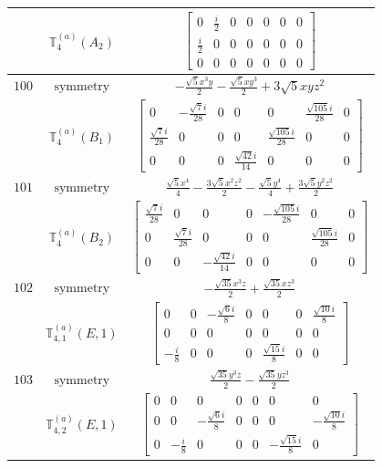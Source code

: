 \documentclass[fleqn,8pt,landscape]{jsarticle}
\begin{document}
\begin{longtable}{ccc}
$  $ & $ \mathbb{T}_{4}^{(a)}(A_{2}) $ & $ \begin{bmatrix} 0 & \frac{i}{2} & 0 & 0 & 0 & 0 & 0 \\ \frac{i}{2} & 0 & 0 & 0 & 0 & 0 & 0 \\ 0 & 0 & 0 & 0 & 0 & 0 & 0 \end{bmatrix} $ \\ \hline
$ 100 $ & $ \text{symmetry} $ & $ - \frac{\sqrt{5} x^{3} y}{2} - \frac{\sqrt{5} x y^{3}}{2} + 3 \sqrt{5} x y z^{2} $ \\
$  $ & $ \mathbb{T}_{4}^{(a)}(B_{1}) $ & $ \begin{bmatrix} 0 & - \frac{\sqrt{7} i}{28} & 0 & 0 & 0 & \frac{\sqrt{105} i}{28} & 0 \\ \frac{\sqrt{7} i}{28} & 0 & 0 & 0 & \frac{\sqrt{105} i}{28} & 0 & 0 \\ 0 & 0 & 0 & \frac{\sqrt{42} i}{14} & 0 & 0 & 0 \end{bmatrix} $ \\ \hline
$ 101 $ & $ \text{symmetry} $ & $ \frac{\sqrt{5} x^{4}}{4} - \frac{3 \sqrt{5} x^{2} z^{2}}{2} - \frac{\sqrt{5} y^{4}}{4} + \frac{3 \sqrt{5} y^{2} z^{2}}{2} $ \\
$  $ & $ \mathbb{T}_{4}^{(a)}(B_{2}) $ & $ \begin{bmatrix} \frac{\sqrt{7} i}{28} & 0 & 0 & 0 & - \frac{\sqrt{105} i}{28} & 0 & 0 \\ 0 & \frac{\sqrt{7} i}{28} & 0 & 0 & 0 & \frac{\sqrt{105} i}{28} & 0 \\ 0 & 0 & - \frac{\sqrt{42} i}{14} & 0 & 0 & 0 & 0 \end{bmatrix} $ \\ \hline
$ 102 $ & $ \text{symmetry} $ & $ - \frac{\sqrt{35} x^{3} z}{2} + \frac{\sqrt{35} x z^{3}}{2} $ \\
$  $ & $ \mathbb{T}_{4,1}^{(a)}(E,1) $ & $ \begin{bmatrix} 0 & 0 & - \frac{\sqrt{6} i}{8} & 0 & 0 & 0 & \frac{\sqrt{10} i}{8} \\ 0 & 0 & 0 & 0 & 0 & 0 & 0 \\ - \frac{i}{8} & 0 & 0 & 0 & \frac{\sqrt{15} i}{8} & 0 & 0 \end{bmatrix} $ \\ \hline
$ 103 $ & $ \text{symmetry} $ & $ \frac{\sqrt{35} y^{3} z}{2} - \frac{\sqrt{35} y z^{3}}{2} $ \\
$  $ & $ \mathbb{T}_{4,2}^{(a)}(E,1) $ & $ \begin{bmatrix} 0 & 0 & 0 & 0 & 0 & 0 & 0 \\ 0 & 0 & - \frac{\sqrt{6} i}{8} & 0 & 0 & 0 & - \frac{\sqrt{10} i}{8} \\ 0 & - \frac{i}{8} & 0 & 0 & 0 & - \frac{\sqrt{15} i}{8} & 0 \end{bmatrix} $ \\ \hline

\end{longtable}
\end{document}

